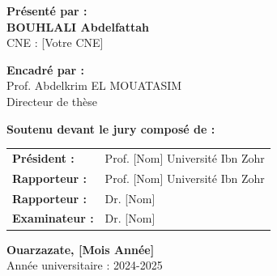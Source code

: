 \documentclass[12pt,a4paper]{report}
\begin{document}
\begin{titlepage}
    \vspace{1.5cm}
    
    \begin{minipage}[t]{0.48\textwidth}
        \textbf{\color{blueuniv}Présenté par :}\\
        \vspace{0.3cm}
        {\large \textbf{BOUHLALI Abdelfattah}}\\
        \vspace{0.2cm}
        CNE : [Votre CNE]\\
        \vspace{0.5cm}
    \end{minipage}%
    \hfill
    \begin{minipage}[t]{0.48\textwidth}
        \textbf{\color{blueuniv}Encadré par :}\\
        \vspace{0.3cm}
        {\large Prof. Abdelkrim EL MOUATASIM}\\
        \vspace{0.2cm}
        Directeur de thèse\\
        \vspace{0.5cm}
    \end{minipage}
    
    \vspace{1cm}
    
    \begin{center}
        \textbf{\color{blueuniv}Soutenu devant le jury composé de :}\\
        \vspace{0.5cm}
        \begin{tabular}{ll}
            \textbf{Président :} & Prof. [Nom] \quad Université Ibn Zohr \\
            \textbf{Rapporteur :} & Prof. [Nom] \quad Université Ibn Zohr \\
            \textbf{Rapporteur :} & Dr. [Nom] \quad [Institution] \\
            \textbf{Examinateur :} & Dr. [Nom] \quad [Institution] \\
        \end{tabular}
    \end{center}
    
    \vfill
    
    \begin{center}
        {\large \textbf{Ouarzazate, [Mois Année]}}\\
        \vspace{0.3cm}
        {\normalsize Année universitaire : 2024-2025}
    \end{center}
    
\end{titlepage}
\end{document}
